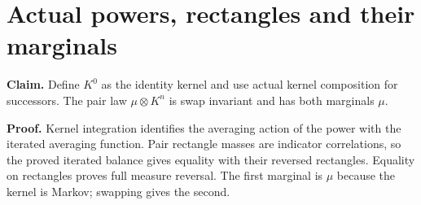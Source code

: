 \documentclass[11pt,a4paper]{article}
\begin{document}
\section{\texorpdfstring{Actual powers, rectangles and their marginals}{Actual powers, rectangles and their marginals}}


\textbf{Claim.} Define \(K^0\) as the identity kernel and use actual kernel composition for successors. The pair law \(\mu\otimes K^n\) is swap invariant and has both marginals \(\mu\).



\textbf{Proof.} Kernel integration identifies the averaging action of the power with the iterated averaging function. Pair rectangle masses are indicator correlations, so the proved iterated balance gives equality with their reversed rectangles. Equality on rectangles proves full measure reversal. The first marginal is \(\mu\) because the kernel is Markov; swapping gives the second.
\end{document}
